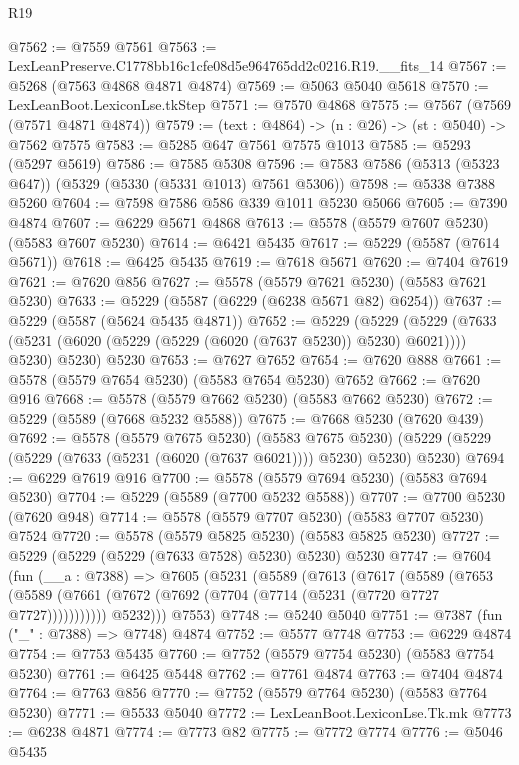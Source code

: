 \begin{lexlean}{R19}
\begin{coremodule}
@7562 := @7559 @7561
@7563 := LexLeanPreserve.C1778bb16c1cfe08d5e964765dd2c0216.R19.__fits_14
@7567 := @5268 (@7563 @4868 @4871 @4874)
@7569 := @5063 @5040 @5618
@7570 := LexLeanBoot.LexiconLse.tkStep
@7571 := @7570 @4868
@7575 := @7567 (@7569 (@7571 @4871 @4874))
@7579 := (text : @4864) -> (n : @26) -> (st : @5040) -> @7562 @7575
@7583 := @5285 @647 @7561 @7575 @1013
@7585 := @5293 (@5297 @5619)
@7586 := @7585 @5308
@7596 := @7583 @7586 (@5313 (@5323 @647)) (@5329 (@5330 (@5331 @1013) @7561 @5306))
@7598 := @5338 @7388 @5260
@7604 := @7598 @7586 @586 @339 @1011 @5230 @5066
@7605 := @7390 @4874
@7607 := @6229 @5671 @4868
@7613 := @5578 (@5579 @7607 @5230) (@5583 @7607 @5230)
@7614 := @6421 @5435
@7617 := @5229 (@5587 (@7614 @5671))
@7618 := @6425 @5435
@7619 := @7618 @5671
@7620 := @7404 @7619
@7621 := @7620 @856
@7627 := @5578 (@5579 @7621 @5230) (@5583 @7621 @5230)
@7633 := @5229 (@5587 (@6229 (@6238 @5671 @82) @6254))
@7637 := @5229 (@5587 (@5624 @5435 @4871))
@7652 := @5229
    (@5229
      (@5229 (@7633 (@5231 (@6020 (@5229 (@5229 (@6020 (@7637 @5230)) @5230) @6021)))) @5230)
      @5230)
    @5230
@7653 := @7627 @7652
@7654 := @7620 @888
@7661 := @5578 (@5579 @7654 @5230) (@5583 @7654 @5230) @7652
@7662 := @7620 @916
@7668 := @5578 (@5579 @7662 @5230) (@5583 @7662 @5230)
@7672 := @5229 (@5589 (@7668 @5232 @5588))
@7675 := @7668 @5230 (@7620 @439)
@7692 := @5578
    (@5579 @7675 @5230)
    (@5583 @7675 @5230)
    (@5229 (@5229 (@5229 (@7633 (@5231 (@6020 (@7637 @6021)))) @5230) @5230) @5230)
@7694 := @6229 @7619 @916
@7700 := @5578 (@5579 @7694 @5230) (@5583 @7694 @5230)
@7704 := @5229 (@5589 (@7700 @5232 @5588))
@7707 := @7700 @5230 (@7620 @948)
@7714 := @5578 (@5579 @7707 @5230) (@5583 @7707 @5230) @7524
@7720 := @5578 (@5579 @5825 @5230) (@5583 @5825 @5230)
@7727 := @5229 (@5229 (@5229 (@7633 @7528) @5230) @5230) @5230
@7747 := @7604
    (fun (__a : @7388) =>
    @7605
      (@5231
        (@5589
          (@7613
            (@7617
              (@5589
                (@7653
                  (@5589 (@7661 (@7672 (@7692 (@7704 (@7714 (@5231 (@7720 @7727 @7727)))))))))))
            @5232)))
      @7553)
@7748 := @5240 @5040
@7751 := @7387 (fun ("_" : @7388) => @7748) @4874
@7752 := @5577 @7748
@7753 := @6229 @4874
@7754 := @7753 @5435
@7760 := @7752 (@5579 @7754 @5230) (@5583 @7754 @5230)
@7761 := @6425 @5448
@7762 := @7761 @4874
@7763 := @7404 @4874
@7764 := @7763 @856
@7770 := @7752 (@5579 @7764 @5230) (@5583 @7764 @5230)
@7771 := @5533 @5040
@7772 := LexLeanBoot.LexiconLse.Tk.mk
@7773 := @6238 @4871
@7774 := @7773 @82
@7775 := @7772 @7774
@7776 := @5046 @5435

\end{coremodule}
\end{lexlean}
